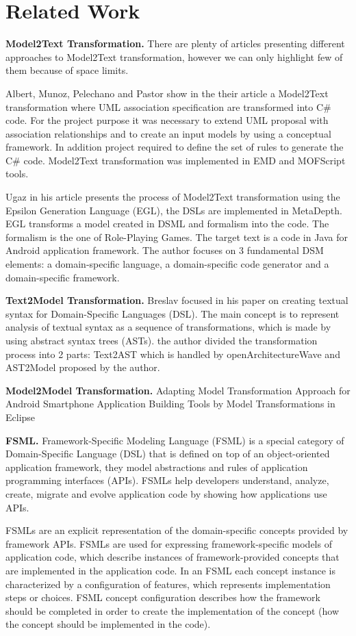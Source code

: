 \section{Related Work}
\textbf{Model2Text Transformation.} There are plenty of articles presenting different approaches to Model2Text transformation, however we can only highlight few of them because of space limits.

Albert, Munoz, Pelechano and Pastor show in the their article \cite{manoli} a Model2Text transformation where UML association specification are transformed into C\# code. For the project purpose it was necessary to extend UML proposal with association relationships and to create an input models by using a conceptual framework. In addition project required to define the set of rules to generate the C\# code. Model2Text transformation was implemented in EMD and MOFScript tools.

Ugaz in his article \cite{ugaz} presents the process of Model2Text transformation using the Epsilon Generation Language (EGL), the DSLs are implemented in MetaDepth. EGL transforms a model created in DSML and formalism into the code. The formalism is the one of Role-Playing Games. The target text is a code in Java for Android application framework. The author focuses on 3 fundamental DSM elements: a domain-specific language, a domain-specific code generator and a domain-specific framework.


\textbf{Text2Model Transformation.} Breslav focused in his paper \cite{breslav} on creating textual syntax for Domain-Specific Languages (DSL). The main concept is to represent analysis of textual syntax as a sequence of transformations, which is made by using abstract syntax trees (ASTs). the author divided the transformation process into 2 parts: Text2AST which is handled by openArchitectureWave and AST2Model proposed by the author.

\textbf{Model2Model Transformation.} Adapting Model Transformation Approach for Android Smartphone Application
Building Tools by Model Transformations in Eclipse 


\textbf{FSML.} Framework-Specific Modeling Language (FSML) is a special category of Domain-Specific Language (DSL) that is defined on top of an object-oriented application framework, they model abstractions and rules of application programming interfaces (APIs). FSMLs help developers understand, analyze, create, migrate and evolve application code by showing how applications use APIs.

FSMLs are an explicit representation of the domain-specific concepts provided by framework APIs. FSMLs are used for expressing framework-specific models of application code, which describe instances of framework-provided concepts that are implemented in the application code. In an FSML each concept instance is characterized by a configuration of features, which represents implementation steps or choices. FSML concept configuration describes how the framework should be completed in order to create the implementation of the concept (how the concept should be implemented in the code).

